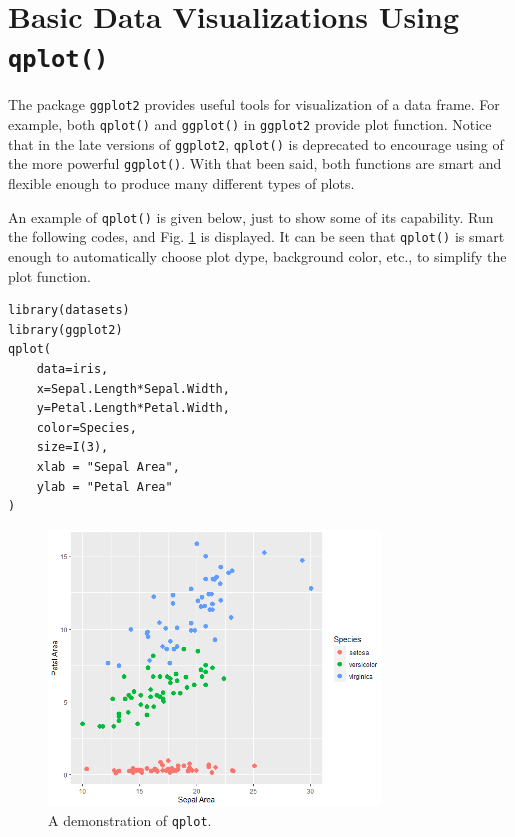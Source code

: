 \section{Basic Data Visualizations Using \texttt{qplot()}} \label{ch:r1:sec:qplot}

The package \verb|ggplot2| provides useful tools for visualization of a data frame. For example, both \verb|qplot()| and \verb|ggplot()| in \verb|ggplot2| provide plot function. Notice that in the late versions of \verb|ggplot2|, \verb|qplot()| is deprecated to encourage using of the more powerful \verb|ggplot()|. With that been said, both functions are smart and flexible enough to produce many different types of plots.

An example of \verb|qplot()| is given below, just to show some of its capability. Run the following codes, and Fig. \ref{ch:r1:fig:qplot_demo} is displayed. It can be seen that \verb|qplot()| is smart enough to automatically choose plot dype, background color, etc., to simplify the plot function.
\begin{lstlisting}
library(datasets)
library(ggplot2)
qplot(
    data=iris,
    x=Sepal.Length*Sepal.Width,
    y=Petal.Length*Petal.Width,
    color=Species,
    size=I(3),
    xlab = "Sepal Area",
    ylab = "Petal Area"
)
\end{lstlisting}

\begin{figure}
	\centering
	\includegraphics[width=250pt]{chapters/ch-r/figures/qplot_demo.png}
	\caption{A demonstration of \texttt{qplot}.} \label{ch:r1:fig:qplot_demo}
\end{figure}

